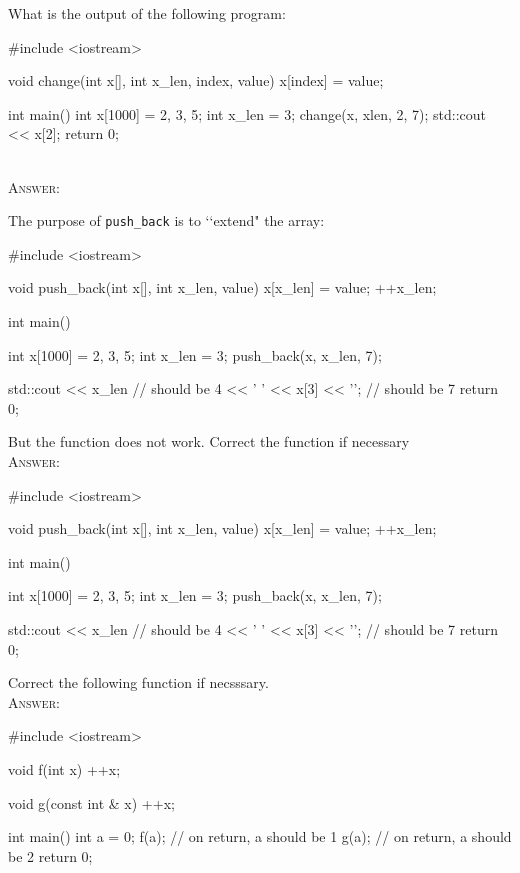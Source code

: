 

\renewcommand\AUTHOR{jdoe5@cougars.ccis.edu} %


\topmattertwo


\nextq
What is the output of the following program:
\begin{console}
#include <iostream>

void change(int x[], int x_len, index, value)
{
    x[index] = value;
}

int main()
{
    int x[1000] = {2, 3, 5};
    int x_len = 3;
    change(x, xlen, 2, 7);
    std::cout << x[2];
    return 0;
}
\end{console}
\\
\textsc{Answer:}\vspace{-2mm}
\begin{answercode}

\end{answercode}

\nextq
The purpose of \verb!push_back! is to \lq\lq extend" the array:
\begin{console}
#include <iostream>

void push_back(int x[], int x_len, value)
{
    x[x_len] = value;
    ++x_len;
}

int main()
{
    int x[1000] = {2, 3, 5};
    int x_len = 3;
    push_back(x, x_len, 7);

    std::cout << x_len           // should be 4
              << ' '        
              << x[3] << '\n';   // should be 7
    return 0;
}
\end{console}
But the function does not work.
Correct the function if necessary
\\
\textsc{Answer:}\vspace{-2mm}
\begin{answercode}
#include <iostream>

void push_back(int x[], int x_len, value)
{
    x[x_len] = value;
    ++x_len;
}

int main()
{
    int x[1000] = {2, 3, 5};
    int x_len = 3;
    push_back(x, x_len, 7);

    std::cout << x_len           // should be 4
              << ' '        
              << x[3] << '\n';   // should be 7
    return 0;
}
\end{answercode}

\nextq
Correct the following function if necsssary.
\\
\textsc{Answer:}\vspace{-2mm}
\begin{answercode}
#include <iostream>

void f(int x)
{
    ++x;
}

void g(const int & x)
{
    ++x;
}

int main()
{
    int a = 0;
    f(a);      // on return, a should be 1
    g(a);      // on return, a should be 2
    return 0;
}
\end{answercode}

